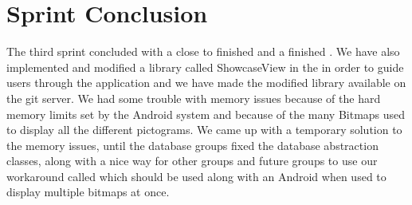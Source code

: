 
\chapter{Sprint Conclusion}
\label{cha:conclusion_sprint_3}

The third sprint concluded with a close to finished \ct and a finished . We have also implemented and modified a library called ShowcaseView in the \ct in order to guide users through the application and we have made the modified library available on the \giraf git server. We had some trouble with memory issues because of the hard memory limits set by the Android system and because of the many Bitmaps used to display all the different pictograms. We came up with a temporary solution to the memory issues, until the database groups fixed the database abstraction classes, along with a nice way for other groups and future groups to use our workaround called  which should be used along with an Android  when used to display multiple bitmaps at once.

